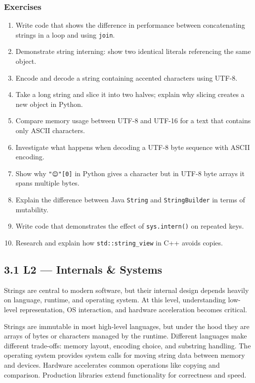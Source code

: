 \documentclass[
  letterpaper,
  DIV=11,
  numbers=noendperiod]{scrreprt}
\providecommand{\tightlist}{%
  \setlength{\itemsep}{0pt}\setlength{\parskip}{0pt}}
\begin{document}
\subsubsection{Exercises}\label{exercises-31}

\begin{enumerate}
\def\labelenumi{\arabic{enumi}.}
\tightlist
\item
  Write code that shows the difference in performance between
  concatenating strings in a loop and using \texttt{join}.
\item
  Demonstrate string interning: show two identical literals referencing
  the same object.
\item
  Encode and decode a string containing accented characters using UTF-8.
\item
  Take a long string and slice it into two halves; explain why slicing
  creates a new object in Python.
\item
  Compare memory usage between UTF-8 and UTF-16 for a text that contains
  only ASCII characters.
\item
  Investigate what happens when decoding a UTF-8 byte sequence with
  ASCII encoding.
\item
  Show why \texttt{"😊"{[}0{]}} in Python gives a character but in UTF-8
  byte arrays it spans multiple bytes.
\item
  Explain the difference between Java \texttt{String} and
  \texttt{StringBuilder} in terms of mutability.
\item
  Write code that demonstrates the effect of \texttt{sys.intern()} on
  repeated keys.
\item
  Research and explain how \texttt{std::string\_view} in C++ avoids
  copies.
\end{enumerate}

\subsection{3.1 L2 --- Internals \& Systems}\label{l2-internals-systems}

Strings are central to modern software, but their internal design
depends heavily on language, runtime, and operating system. At this
level, understanding low-level representation, OS interaction, and
hardware acceleration becomes critical.

Strings are immutable in most high-level languages, but under the hood
they are arrays of bytes or characters managed by the runtime. Different
languages make different trade-offs: memory layout, encoding choice, and
substring handling. The operating system provides system calls for
moving string data between memory and devices. Hardware accelerates
common operations like copying and comparison. Production libraries
extend functionality for correctness and speed.
\end{document}
